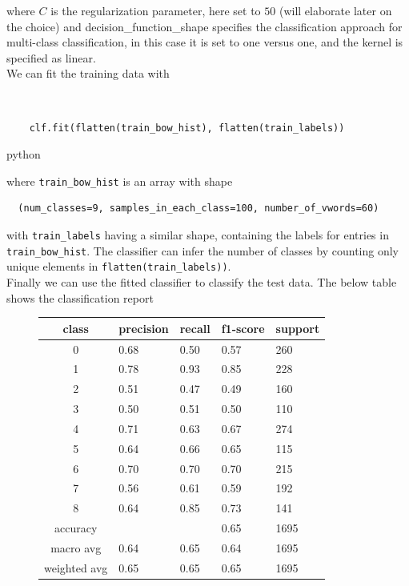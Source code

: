 \begin{homeworkProblem}
where $C$ is the regularization parameter, here set to $50$ (will elaborate
later on the choice) and decision\_function\_shape specifies
the classification approach for multi-class classification, in this case it is
set to one versus one, and the kernel is specified as linear.
\\

We can fit the training data with

\\

\begin{verbatim}
    clf.fit(flatten(train_bow_hist), flatten(train_labels))
\end{verbatim}{python}

where \texttt{train_bow_hist} is an array with shape

\begin{verbatim}
  (num_classes=9, samples_in_each_class=100, number_of_vwords=60)
\end{verbatim}

with \texttt{train_labels} having a similar shape, containing the labels
for entries in \texttt{train_bow_hist}. The classifier can infer the number
of classes by counting only unique elements in
\texttt{flatten(train_labels))}.
\\

Finally we can use the fitted classifier to classify the test data. The below
table shows the classification report

\begin{figure}[H]
  \centering
    \begin{tabular}{c l l l l}
      class      &precision & recall & f1-score & support \\
      \hline
      0       &0.68      &0.50      &0.57       &260 \\
      1       &0.78      &0.93      &0.85       &228\\
      2       &0.51      &0.47      &0.49       &160\\
      3       &0.50      &0.51      &0.50       &110\\
      4       &0.71      &0.63      &0.67       &274\\
      5       &0.64      &0.66      &0.65       &115\\
      6       &0.70      &0.70      &0.70       &215\\
      7       &0.56      &0.61      &0.59       &192\\
      8       &0.64      &0.85      &0.73       &141\\
      \hline
    accuracy        &          &          & 0.65     &1695 \\
    macro avg       &0.64      &0.65      &0.64      &1695 \\
    weighted avg    &0.65      &0.65      &0.65      &1695
  \end{tabular}
\end{figure}


\end{homeworkProblem}
